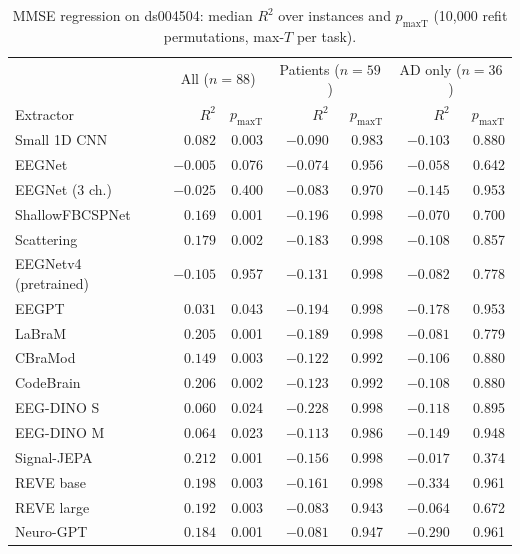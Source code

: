 \documentclass[11pt]{article}
\begin{document}
\begin{table}[h]
\centering\footnotesize\setlength{\tabcolsep}{4pt}
\caption{MMSE regression on ds004504: median $R^2$ over instances and $p_\text{maxT}$ (10,000 refit
permutations, max-$T$ per task).}
\label{tab:mmse}
\begin{tabular}{@{}lrrrrrr@{}}
\toprule
& \multicolumn{2}{c}{All ($n = 88$)} & \multicolumn{2}{c}{Patients ($n = 59$)} & \multicolumn{2}{c}{AD only ($n = 36$)} \\
Extractor & $R^2$ & $p_\text{maxT}$ & $R^2$ & $p_\text{maxT}$ & $R^2$ & $p_\text{maxT}$ \\
\midrule
Small 1D CNN & $0.082$ & 0.003 & $-0.090$ & 0.983 & $-0.103$ & 0.880 \\
EEGNet & $-0.005$ & 0.076 & $-0.074$ & 0.956 & $-0.058$ & 0.642 \\
EEGNet (3 ch.) & $-0.025$ & 0.400 & $-0.083$ & 0.970 & $-0.145$ & 0.953 \\
ShallowFBCSPNet & $0.169$ & 0.001 & $-0.196$ & 0.998 & $-0.070$ & 0.700 \\
Scattering & $0.179$ & 0.002 & $-0.183$ & 0.998 & $-0.108$ & 0.857 \\
EEGNetv4 (pretrained) & $-0.105$ & 0.957 & $-0.131$ & 0.998 & $-0.082$ & 0.778 \\
EEGPT & $0.031$ & 0.043 & $-0.194$ & 0.998 & $-0.178$ & 0.953 \\
LaBraM & $0.205$ & 0.001 & $-0.189$ & 0.998 & $-0.081$ & 0.779 \\
CBraMod & $0.149$ & 0.003 & $-0.122$ & 0.992 & $-0.106$ & 0.880 \\
CodeBrain & $0.206$ & 0.002 & $-0.123$ & 0.992 & $-0.108$ & 0.880 \\
EEG-DINO S & $0.060$ & 0.024 & $-0.228$ & 0.998 & $-0.118$ & 0.895 \\
EEG-DINO M & $0.064$ & 0.023 & $-0.113$ & 0.986 & $-0.149$ & 0.948 \\
Signal-JEPA & $0.212$ & 0.001 & $-0.156$ & 0.998 & $-0.017$ & 0.374 \\
REVE base & $0.198$ & 0.003 & $-0.161$ & 0.998 & $-0.334$ & 0.961 \\
REVE large & $0.192$ & 0.003 & $-0.083$ & 0.943 & $-0.064$ & 0.672 \\
Neuro-GPT & $0.184$ & 0.001 & $-0.081$ & 0.947 & $-0.290$ & 0.961 \\
\bottomrule
\end{tabular}
\end{table}
\end{document}
